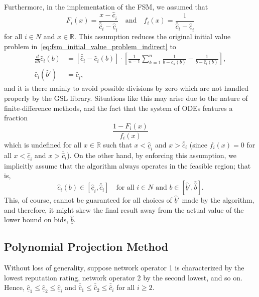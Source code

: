 Furthermore, in the implementation of the FSM, we assumed that
\begin{equation*}
  F_i(x) = \frac{x - \underline{\hat{c}}_i}{\bar{\hat{c}}_i - \underline{\hat{c}}_i} \quad\text{and}\quad f_i(x) = \frac{1}{\bar{\hat{c}}_i - \underline{\hat{c}}_i}
\end{equation*}
for all $i\in N$ and $x\in\mathbb{R}$. This assumption reduces the original initial value problem in~\eqref{eq:fsm_initial_value_problem_indirect} to
\begin{equation*}
  \begin{array}{ll}
    \displaystyle\frac{d}{db}\hat{c}_i(b) &= \displaystyle\left[ \bar{\hat{c}}_i - \hat{c}_i(b)\right]\cdot\left[ \frac{1}{n-1}\sum_{k=1}^n\frac{1}{b - \hat{c}_k(b)} - \frac{1}{b - \hat{c}_i(b)} \right], \\[2ex]
    \hat{c}_i(\underline{\hat{b}}') &= \underline{\hat{c}}_i,
  \end{array}
\end{equation*}
and it is there mainly to avoid possible divisions by zero which are not handled properly by the GSL library. Situations like this may arise due to the nature of finite-difference methods, and the fact that the system of ODEs features a fraction
\begin{equation*}
  \frac{1 - F_i(x)}{f_i(x)}
\end{equation*}
which is undefined for all $x\in\mathbb{R}$ such that $x < \underline{\hat{c}}_i$ and $x > \bar{\hat{c}}_i$ (since $f_i(x) = 0$ for all $x < \underline{\hat{c}}_i$ and $x > \bar{\hat{c}}_i$). On the other hand, by enforcing this assumption, we implicitly assume that the algorithm always operates in the feasible region; that is,
\begin{equation*}
  \hat{c}_i(b)\in [\underline{\hat{c}}_i, \bar{\hat{c}}_i] \quad\text{for all } i\in N \text{ and } b\in\left[\underline{\hat{b}}', \bar{\hat{b}}\right].
\end{equation*}
This, of course, cannot be guaranteed for all choices of $\underline{\hat{b}}'$ made by the algorithm, and therefore, it might skew the final result away from the actual value of the lower bound on bids, $\underline{\hat{b}}$.

\subsection{Polynomial Projection Method} %
\label{sub:polynomial_projection_method_indirect}
Without loss of generality, suppose network operator 1 is characterized by the lowest reputation rating, network operator 2 by the second lowest, and so on. Hence, $\underline{\hat{c}}_1\leq \underline{\hat{c}}_2\leq \underline{\hat{c}}_i$ and $\bar{\hat{c}}_1\leq \bar{\hat{c}}_2\leq \bar{\hat{c}}_i$ for all $i\geq 2$.

